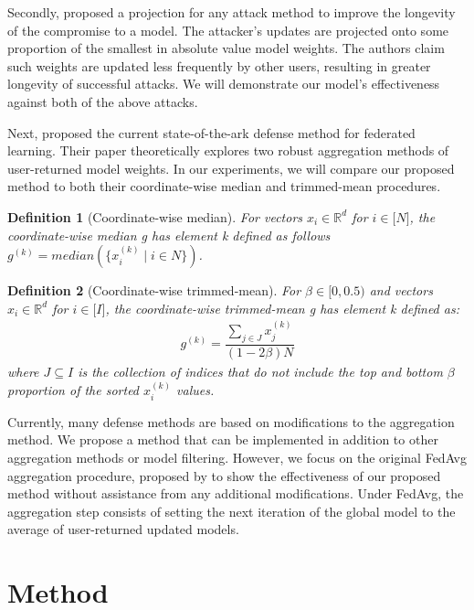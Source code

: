 \documentclass{article} %
\newtheorem{definition}{Definition}
\begin{document}
Secondly, \cite{neurotoxin} proposed a projection for any attack method to improve the longevity of the compromise to a model. The attacker's updates are projected onto some proportion of the smallest in absolute value model weights. The authors claim such weights are updated less frequently by other users, resulting in greater longevity of successful attacks. We will demonstrate our model's effectiveness against both of the above attacks.

Next, \cite{trim-mean} proposed the current state-of-the-ark defense method for federated learning. Their paper theoretically explores two robust aggregation methods of user-returned model weights. In our experiments, we will compare our proposed method to both their coordinate-wise median and trimmed-mean procedures.

\begin{definition}[Coordinate-wise median] 
For vectors $x_i \in \mathbb{R}^{d}$ for $i \in \mathopen[N\mathclose]$, the coordinate-wise median g has element k defined as follows $g^{(k)} = median(\{x_i^{(k)} \mid i \in N\})$.
\end{definition}

\begin{definition}[Coordinate-wise trimmed-mean]
For $\beta \in \mathopen[ 0, 0.5 \mathclose)$ and vectors $x_i \in \mathbb{R}^{d}$ for $i \in \mathopen[I\mathclose]$, the coordinate-wise trimmed-mean g has element k defined as:
\begin{align*}
g^{(k)} = \dfrac{\sum_{j \in J}{x_j^{(k)}}}{(1 - 2\beta)N}
\end{align*}
where $J \subseteq I$ is the collection of indices that do not include the top and bottom $\beta$ proportion of the sorted $x_i^{(k)}$ values.
\end{definition}

Currently, many defense methods are based on modifications to the aggregation method. We propose a method that can be implemented in addition to other aggregation methods or model filtering. However, we focus on the original FedAvg aggregation procedure, proposed by \cite{fedavg} to show the effectiveness of our proposed method without assistance from any additional modifications. Under FedAvg, the aggregation step consists of setting the next iteration of the global model to the average of user-returned updated models. 


%
\section{Method}
\end{document}
